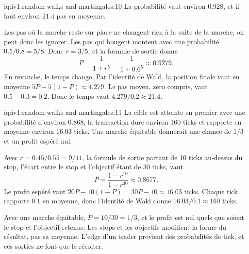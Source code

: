 \enlargethispage{-4\baselineskip}%
\begin{solution}{iq:iv1:random-walks-and-martingales:10}
La probabilité vaut environ $0.928$, et il faut environ $21.4$ pas en moyenne.

Les pas où la marche reste sur place ne changent rien à la suite de la marche, on peut donc les ignorer. Les pas qui bougent montent avec une probabilité $0.5/0.8 = 5/8$. Donc $r = 3/5$, et la formule de sortie donne
\[
P = \frac{1}{1 + r^5} = \frac{1}{1 + 0.6^5} \approx 0.9279.
\]
En revanche, le temps change. Par l'identité de Wald, la position finale vaut en moyenne $5P - 5(1 - P) \approx 4.279$. Le pas moyen, zéro compris, vaut $0.5 - 0.3 = 0.2$. Donc le temps vaut $4.279/0.2 \approx 21.4$.

\end{solution}

\begin{solution}{iq:iv1:random-walks-and-martingales:11}
La cible est atteinte en premier avec une probabilité d'environ $0.868$, la transaction dure environ 160 ticks et rapporte en moyenne environ $16.03$ ticks. Une marche équitable donnerait une chance de $1/3$ et un profit espéré nul.

Avec $r = 0.45/0.55 = 9/11$, la formule de sortie partant de 10 ticks au-dessus du stop, l'écart entre le stop et l'objectif étant de 30 ticks, vaut
\[
P = \frac{1 - r^{10}}{1 - r^{30}} \approx 0.8677.
\]
Le profit espéré vaut $20P - 10(1 - P) = 30P - 10 \approx 16.03$ ticks. Chaque tick rapporte $0.1$ en moyenne, donc l'identité de Wald donne $16.03/0.1 \approx 160$ ticks.

Avec une marche équitable, $P = 10/30 = 1/3$, et le profit est nul quels que soient le stop et l'objectif retenus. Les stops et les objectifs modifient la forme du résultat, pas sa moyenne. L'edge d'un trader provient des probabilités de tick, et ces sorties ne font que le récolter.

\end{solution}

